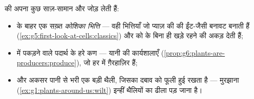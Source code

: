 \begin{proposition}[पौधों की कोशिकाओं में कुछ और भी होता है]\label{prop:g6:cell-unit-of-life:plantextras}
 की  अपना कुछ साज़-सामान और जोड़ लेती हैं:
\begin{itemize}
  \item {} के बाहर एक सख़्त \emph{कोशिका भित्ति}
--- वही भित्तियाँ जो प्याज़ की  की ईंट-जैसी
        बनावट बनाती हैं (\cref{ex:g5:first-look-at-cells:classics})
        और  को  के बिना ही खड़े रहने की अकड़ देती हैं;
  \item {} में  पकड़ने वाले पदार्थ के हरे कण --- यानी
         की कार्यशालाएँ
        (\cref{prop:g6:plants-are-producers:produce}), जो हर 
         में ग़ैरहाज़िर हैं;
  \item और अकसर पानी से भरी एक बड़ी थैली, जिसका दबाव  को फूली
        हुई रखता है --- मुरझाना
        (\cref{ex:g1:plants-around-us:wilt}) इन्हीं थैलियों का ढीला
        पड़ जाना है।
\end{itemize}
\end{proposition}
\admitted

